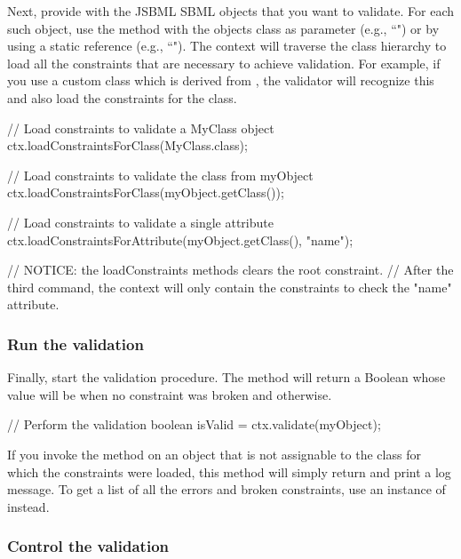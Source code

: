 Next, provide  with the JSBML SBML objects that you
want to validate. For each such object, use the method
 with the objects class as
parameter (e.g., ``") or by using a static reference
(e.g., ``"). The context will traverse the class
hierarchy to load all the constraints that are necessary to achieve
validation. For example, if you use a custom class which is derived from
\Species, the validator will recognize this and also load the constraints for
the \Species class.

\vspace*{1ex}
\begin{example}[style=java, title={Three different ways to load constraints.}]
// Load constraints to validate a MyClass object
ctx.loadConstraintsForClass(MyClass.class);	

// Load constraints to validate the class from myObject
ctx.loadConstraintsForClass(myObject.getClass());

// Load constraints to validate a single attribute
ctx.loadConstraintsForAttribute(myObject.getClass(), "name");

// NOTICE: the loadConstraints methods clears the root constraint.
// After the third command, the context will only contain the constraints to check the "name" attribute.
\end{example}


\subsubsection{Run the validation}

Finally, start the validation procedure. The method 
will return a Boolean whose value will be  when no constraint was
broken and  otherwise.

\begin{example}[style=java, title={Validate.}]
// Perform the validation
boolean isValid = ctx.validate(myObject);
\end{example}

If you invoke the  method on an object that is not assignable
to the class for which the constraints were loaded, this method will simply
return  and print a log message.  To get a list of all the errors
and broken constraints, use an instance of 
instead.


\subsubsection{Control the validation}

